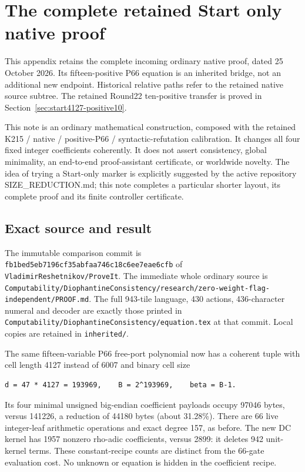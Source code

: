 \section{The complete retained Start only native proof}
\label{sec:native-source-proof}
This appendix retains the complete incoming ordinary native proof, dated
25 October 2026. Its fifteen-positive P66 equation is an inherited bridge,
not an additional new endpoint. Historical relative paths refer to the
retained native source subtree. The retained Round22 ten-positive transfer is proved
in Section~\ref{sec:start4127-positive10}.

This note is an ordinary mathematical construction, composed with the retained K215 / native / positive-P66 / syntactic-refutation calibration. It changes all four fixed integer coefficients coherently. It does not assert consistency, global minimality, an end-to-end proof-assistant certificate, or worldwide novelty. The idea of trying a Start-only marker is explicitly suggested by the active repository SIZE\_REDUCTION.md; this note completes a particular shorter layout, its complete proof and its finite controller certificate.

\subsection{Exact source and result}
The immutable comparison commit is \nolinkurl{fb1bed5eb7196cf35abfaa746c18c6ee7eae6cfb} of \nolinkurl{VladimirReshetnikov/ProveIt}. The immediate whole ordinary source is \nolinkurl{Computability/DiophantineConsistency/research/zero-weight-flag-independent/PROOF.md}. The full 943-tile language, 430 actions, 436-character numeral and decoder are exactly those printed in \nolinkurl{Computability/DiophantineConsistency/equation.tex} at that commit. Local copies are retained in \nolinkurl{inherited/}.

The same fifteen-variable P66 free-port polynomial now has a coherent tuple with cell length 4127 instead of 6007 and binary cell size

\begin{Verbatim}[fontsize=\small,breaklines=true,breakanywhere=true,breaksymbolleft={}]
d = 47 * 4127 = 193969,    B = 2^193969,    beta = B-1.
\end{Verbatim}

Its four minimal unsigned big-endian coefficient payloads occupy 97046 bytes, versus 141226, a reduction of 44180 bytes (about 31.28\%). There are 66 live integer-leaf arithmetic operations and exact degree 157, as before. The new DC kernel has 1957 nonzero rho-adic coefficients, versus 2899: it deletes 942 unit-kernel terms. These constant-recipe counts are distinct from the 66-gate evaluation cost. No unknown or equation is hidden in the coefficient recipe.

